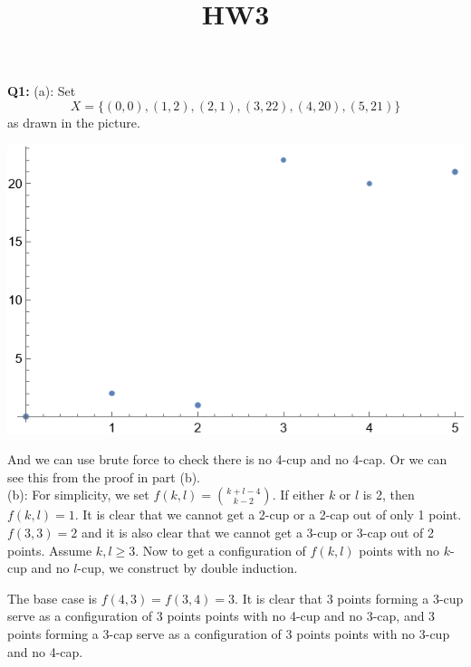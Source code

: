 \documentclass[12pt,reqno]{amsart}
\theoremstyle{definition}
\begin{document}
\title{HW3}

\noindent \textbf{Q1:} (a): Set   $$X=\{(0,0),(1,2),(2,1),(3,22),(4,20),(5,21)\}$$ as drawn in the picture.

\begin{center}
  \includegraphics[scale=0.4]{pentagon.png}
\end{center} And we can use brute force to check there is no 4-cup and no 4-cap. Or we can see this from the proof in part (b).\\


(b): For simplicity, we set $f(k,l)=\binom{k+l-4}{k-2}$. If either $k$ or $l$ is 2, then $f(k,l)=1$. It is clear that we cannot get a 2-cup or a 2-cap out of only 1 point. $f(3,3)=2$ and it is also clear that we cannot get a 3-cup or 3-cap out of 2 points. Assume $k,l\geq 3$. Now to get a configuration of $f(k,l)$ points with no $k$-cup and no $l$-cup, we construct by double induction.


The base case is $f(4,3)=f(3,4)=3$. It is clear that 3 points forming a 3-cup serve as a configuration of 3 points points with no 4-cup and no 3-cap, and 3 points forming a 3-cap serve as a configuration of 3 points points with no 3-cup and no 4-cap.
\end{document}
